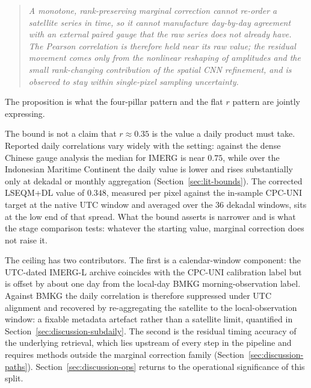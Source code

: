 \begin{quote}
\emph{A monotone, rank-preserving marginal correction cannot
re-order a satellite series in time, so it cannot manufacture
day-by-day agreement with an external paired gauge that the raw
series does not already have. The Pearson correlation is therefore
held near its raw value; the residual movement comes only from the
nonlinear reshaping of amplitudes and the small rank-changing
contribution of the spatial CNN refinement, and is observed to
stay within single-pixel sampling uncertainty.}
\end{quote}

\noindent The proposition is what the four-pillar pattern and the
flat $r$ pattern are jointly expressing.

The bound is not a claim that $r \approx 0.35$ is the value a daily
product must take. Reported daily correlations vary widely with the
setting: against the dense Chinese gauge analysis the median for
IMERG is near $0.75$, while over the Indonesian Maritime Continent
the daily value is lower and rises substantially only at dekadal or
monthly aggregation (Section~\ref{sec:lit-bounds}). The corrected
LSEQM+DL value of $0.348$, measured per pixel against the
in-sample CPC-UNI target at the native UTC window and averaged over
the $36$ dekadal windows, sits at the low end of that spread. What
the bound asserts is narrower and is what the stage comparison
tests: whatever the starting value, marginal correction does not
raise it.

The ceiling has two
contributors. The first is a calendar-window component: the
UTC-dated IMERG-L archive coincides with the CPC-UNI calibration
label but is offset by about one day from the local-day BMKG
morning-observation label. Against BMKG the daily correlation
is therefore suppressed under UTC alignment and recovered by re-aggregating
the satellite to the local-observation window: a fixable metadata
artefact rather than a satellite limit, quantified in
Section~\ref{sec:discussion-subdaily}. The second is the residual
timing accuracy of the underlying retrieval, which lies upstream
of every step in the pipeline and requires methods outside the
marginal correction family
(Section~\ref{sec:discussion-paths}).
Section~\ref{sec:discussion-ops} returns to the operational
significance of this split.

